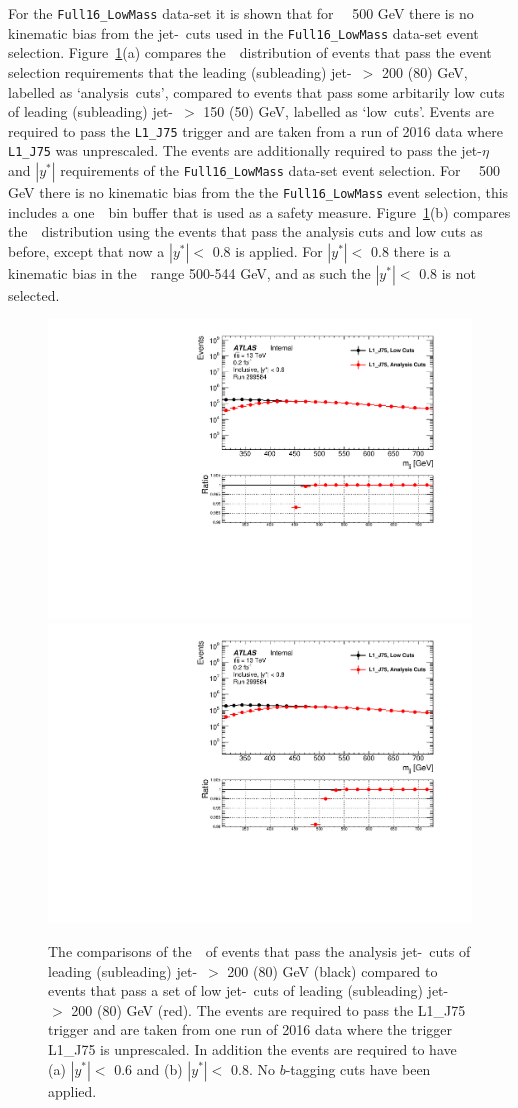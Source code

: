 For the \verb|Full16_LowMass| data-set it is shown that for \mjj~\gt~500 GeV there is no kinematic bias
from the jet-\pT~cuts used in the \verb|Full16_LowMass| data-set event selection.
Figure~\ref{fig:evt-lowmass_turnon}(a) compares the~\mjj~distribution of events
that pass the event selection requirements that the leading (subleading) jet-\pT~$>$ 200 (80) GeV, labelled as `analysis~cuts',
compared to events that pass some arbitarily low cuts of leading (subleading) jet-\pT~$>$ 150 (50) GeV, labelled as `low~cuts'.
Events are required to pass the \verb|L1_J75| trigger and are taken from a run of 2016 data where \verb|L1_J75| was unprescaled.
The events are additionally required to pass the jet-$\eta$ and $|y^*|$ requirements of the \verb|Full16_LowMass| data-set event selection.
For \mjj~\gt~500 GeV there is no kinematic bias from the the \verb|Full16_LowMass| event selection,
this includes a one~\mjj~bin buffer that is used as a safety measure.
Figure~\ref{fig:evt-lowmass_turnon}(b) compares the~\mjj~distribution using the events that pass the analysis cuts and low cuts as before,
except that now a $|y^*| <$ 0.8 is applied.
For $|y^*| <$ 0.8 there is a kinematic bias in the~\mjj~range 500-544 GeV,
and as such the $|y^*| <$ 0.8 is not selected.

\begin{figure}[!ht]
  \begin{center}
    \captionsetup[subfigure]{aboveskip=0pt,justification=centering}
     {\includegraphics[width=0.48\linewidth, angle=0]{figs/Dibjet/LowMass/evt-mjj_yStar0p6.pdf}}
     {\includegraphics[width=0.48\linewidth, angle=0]{figs/Dibjet/LowMass/evt-mjj_yStar0p8.pdf}}
  \end{center}
  \caption{The comparisons of the~\mjj~of events that pass the analysis jet-\pT~cuts of leading (subleading) jet-\pT~$>$ 200 (80) GeV (black)
    compared to events that pass a set of low jet-\pT~cuts of leading (subleading) jet-\pT~$>$ 200 (80) GeV (red).
    The events are required to pass the L1\_J75 trigger and are taken from one run of 2016 data where the trigger L1\_J75 is unprescaled.
    In addition the events are required to have (a) $|y^*| <$ 0.6 and (b) $|y^*| <$ 0.8.
    No $b$-tagging cuts have been applied.}
     \label{fig:evt-lowmass_turnon}
\end{figure}

